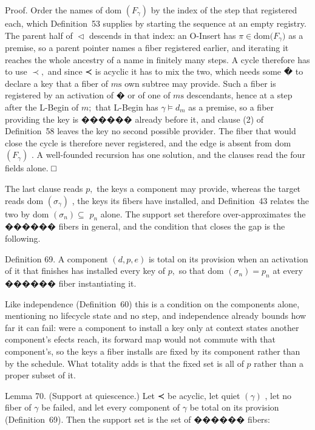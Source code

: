 \documentclass[
  10
]{article}
\begin{document}
Proof. Order the names of dom \(\left( F _ { \gamma } \right)\) by the
index of the step that registered each, which Definition~53 supplies by
starting the sequence at an empty registry. The parent half of
\(\vartriangleleft\) descends in that index: an O-Insert has
\(\pi \in \mathrm { d o m } \big ( F _ { \gamma } \big )\) as a premise,
so a parent pointer names a fiber registered earlier, and iterating it
reaches the whole ancestry of a name in finitely many steps. A cycle
therefore has to use \(\prec ,\) and since ≺ is acyclic it has to mix
the two, which needs some � to declare a key that a fiber of
\(m \mathrm { { s } }\) own subtree may provide. Such a fiber is
registered by an activation of � or of one of \(m \mathrm { { s } }\)
descendants, hence at a step after the L-Begin of \(m ;\) that L-Begin
has \(\gamma \models d _ { m }\) as a premise, so a fiber providing the
key is ������ already before it, and clause (2) of Definition~58 leaves
the key no second possible provider. The fiber that would close the
cycle is therefore never registered, and the edge is absent from dom
\(\left( F _ { \gamma } \right)\) . A well-founded recursion has one
solution, and the clauses read the four fields alone. □

The last clause reads \(p ,\) the keys a component may provide, whereas
the target reads dom \(\left( \sigma _ { \gamma } \right)\) , the keys
its fibers have installed, and Definition~43 relates the two by dom
\(( \sigma _ { n } ) \subseteq\) \(p _ { n }\) alone. The support set
therefore over-approximates the ������ fibers in general, and the
condition that closes the gap is the following.

Definition 69. A component \(( d , p , e )\) is total on its provision
when an activation of it that finishes has installed every key of
\(p ,\) so that dom \(( \sigma _ { n } ) = p _ { n }\) at every ������
fiber instantiating it.

Like independence (Definition~60) this is a condition on the components
alone, mentioning no lifecycle state and no step, and independence
already bounds how far it can fail: were a component to install a key
only at context states another component's efects reach, its forward map
would not commute with that component's, so the keys a fiber installs
are fixed by its component rather than by the schedule. What totality
adds is that the fixed set is all of \(p\) rather than a proper subset
of it.

Lemma 70. (Support at quiescence.) Let ≺ be acyclic, let quiet
\(( \gamma )\) , let no fiber of \(\gamma\) be failed, and let every
component of \(\gamma\) be total on its provision (Definition~69). Then
the support set is the set of ������ fibers:
\end{document}
